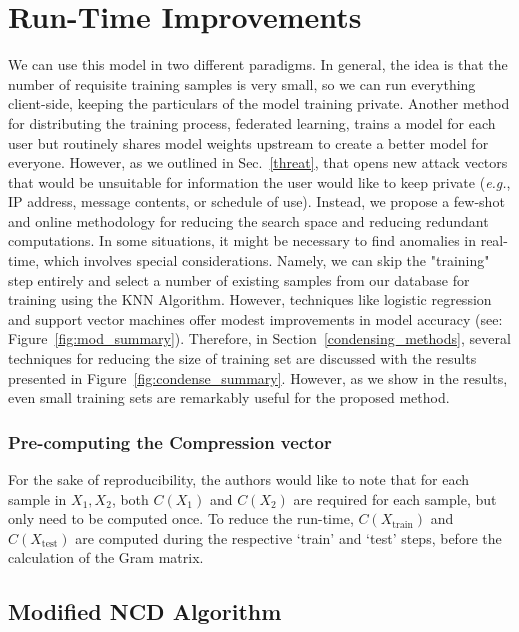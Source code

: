 \documentclass[conference]{IEEEtran}
\begin{document}
\section{Run-Time Improvements}
\label{improvements}
We can use this model in two different paradigms. In general, the idea is that the number of requisite training samples is very small, so we can run everything client-side, keeping the particulars of the model training private. Another method for distributing the training process, federated learning, trains a model for each user but routinely shares model weights upstream to create a better model for everyone. 
However, as we outlined in Sec.~\ref{threat}, that opens new attack vectors that would be unsuitable for information the user would like to keep private (\textit{e.g.}, IP address, message contents, or schedule of use). 
Instead, we propose a few-shot and online methodology for reducing the search space and reducing redundant computations.
In some situations, it might be necessary to find anomalies in real-time, which involves special considerations. 
Namely, we can skip the "training" step entirely and select a number of existing samples from our database for training using the KNN Algorithm.
However, techniques like logistic regression and support vector machines offer modest improvements in model accuracy (see: Figure~\ref{fig:mod_summary}).
Therefore, in Section~\ref{condensing_methods}, several techniques for reducing the size of training set are discussed with the results presented in Figure~\ref{fig:condense_summary}.
However, as we show in the results, even small training sets are remarkably useful for the proposed method. 



\subsubsection{Pre-computing the Compression vector}
For the sake of reproducibility, the authors would like to note that for each sample in $X_1, X_2$, both $C(X_1)$ and $C(X_2)$ are required for each sample, but only need to be computed once. To reduce the run-time, $C(X_{\text{train}})$ and $C(X_{\text{test}})$ are computed during the respective `train' and `test' steps, before the calculation of the Gram matrix.


\subsection{Modified NCD Algorithm}
\end{document}
